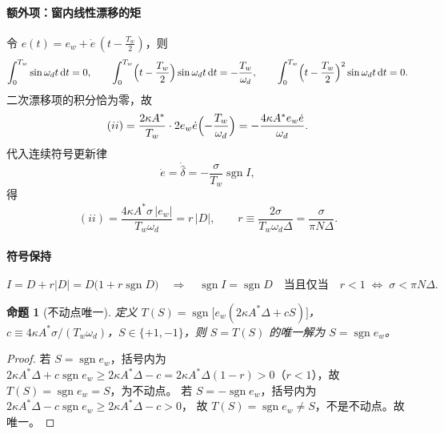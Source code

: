 \documentclass[11pt,a4paper]{article}
\newtheorem{proposition}{命题}
\begin{document}
\paragraph{额外项：窗内线性漂移的矩}
令 $e(t)=e_w+\dot e\,(t-\tfrac{T_w}{2})$，则
\begin{equation}
\int_{0}^{T_w}\sin\omega_d t\,\mathrm{d}t=0,
\qquad
\int_{0}^{T_w}\Bigl(t-\frac{T_w}{2}\Bigr)\sin\omega_d t\,\mathrm{d}t=-\frac{T_w}{\omega_d},
\qquad
\int_{0}^{T_w}\Bigl(t-\frac{T_w}{2}\Bigr)^{2}\sin\omega_d t\,\mathrm{d}t=0 .
\label{eq:esmoments}
\end{equation}
二次漂移项的积分恰为零，故
\begin{equation}
(ii)=\frac{2\kappa A^{*}}{T_w}\cdot 2e_w\dot e\Bigl(-\frac{T_w}{\omega_d}\Bigr)
=-\frac{4\kappa A^{*}e_w\dot e}{\omega_d}.
\label{eq:esextra}
\end{equation}
代入连续符号更新律
\begin{equation}
\dot e=\dot{\hat\delta}=-\frac{\sigma}{T_w}\operatorname{sgn}I,
\label{eq:eslaw}
\end{equation}
得
\begin{equation}
(ii)=\frac{4\kappa A^{*}\sigma\,|e_w|}{T_w\omega_d}
= r\,|D|,
\qquad
r\equiv\frac{2\sigma}{T_w\omega_d\Delta}=\frac{\sigma}{\pi N\Delta}.
\label{eq:esr}
\end{equation}

\paragraph{符号保持}
\begin{equation}
I=D+r|D|=D\bigl(1+r\operatorname{sgn}D\bigr)
\quad\Longrightarrow\quad
\operatorname{sgn}I=\operatorname{sgn}D
\quad\text{当且仅当}\quad r<1
\;\Longleftrightarrow\;\sigma<\pi N\Delta .
\label{eq:essign}
\end{equation}

\begin{proposition}[不动点唯一]
定义 $T(S)=\operatorname{sgn}\bigl[e_w(2\kappa A^{*}\Delta+cS)\bigr]$，
$c\equiv4\kappa A^{*}\sigma/(T_w\omega_d)$，$S\in\{+1,-1\}$，则 $S=T(S)$ 的唯一解为 $S=\operatorname{sgn}e_w$。
\end{proposition}
\begin{proof}
若 $S=\operatorname{sgn}e_w$，括号内为 $2\kappa A^{*}\Delta+c\operatorname{sgn}e_w\ge 2\kappa A^{*}\Delta-c
=2\kappa A^{*}\Delta(1-r)>0$（$r<1$），故 $T(S)=\operatorname{sgn}e_w=S$，为不动点。
若 $S=-\operatorname{sgn}e_w$，括号内为 $2\kappa A^{*}\Delta-c\operatorname{sgn}e_w\ge 2\kappa A^{*}\Delta-c>0$，
故 $T(S)=\operatorname{sgn}e_w\ne S$，不是不动点。故唯一。
\end{proof}
\end{document}
